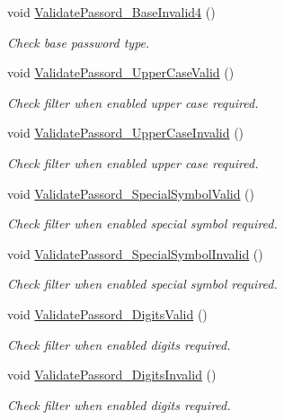 \begin{DoxyCompactItemize}
void \mbox{\hyperlink{class_authority_controller_1_1_tests_1_1_regex_af50420dae851df532abb87e5e9e12e81}{Validate\+Passord\+\_\+\+Base\+Invalid4}} ()
\begin{DoxyCompactList}\small\item\em Check base password type. \end{DoxyCompactList}\item 
void \mbox{\hyperlink{class_authority_controller_1_1_tests_1_1_regex_a66cf48873a320e5d6d0a1e63b1abbb71}{Validate\+Passord\+\_\+\+Upper\+Case\+Valid}} ()
\begin{DoxyCompactList}\small\item\em Check filter when enabled upper case required. \end{DoxyCompactList}\item 
void \mbox{\hyperlink{class_authority_controller_1_1_tests_1_1_regex_a8cda73ecc7836a9b0801addcd34784c1}{Validate\+Passord\+\_\+\+Upper\+Case\+Invalid}} ()
\begin{DoxyCompactList}\small\item\em Check filter when enabled upper case required. \end{DoxyCompactList}\item 
void \mbox{\hyperlink{class_authority_controller_1_1_tests_1_1_regex_a4638efee69d7d3d2bf072fa8dc9a82a3}{Validate\+Passord\+\_\+\+Special\+Symbol\+Valid}} ()
\begin{DoxyCompactList}\small\item\em Check filter when enabled special symbol required. \end{DoxyCompactList}\item 
void \mbox{\hyperlink{class_authority_controller_1_1_tests_1_1_regex_a8565a902ecf3f1abe0c2b25249d5ce6e}{Validate\+Passord\+\_\+\+Special\+Symbol\+Invalid}} ()
\begin{DoxyCompactList}\small\item\em Check filter when enabled special symbol required. \end{DoxyCompactList}\item 
void \mbox{\hyperlink{class_authority_controller_1_1_tests_1_1_regex_ab775e928b51f2cf90a705f50e7b6c2d8}{Validate\+Passord\+\_\+\+Digits\+Valid}} ()
\begin{DoxyCompactList}\small\item\em Check filter when enabled digits required. \end{DoxyCompactList}\item 
void \mbox{\hyperlink{class_authority_controller_1_1_tests_1_1_regex_a14648a7fbcdfe4500d019d175d2e4b68}{Validate\+Passord\+\_\+\+Digits\+Invalid}} ()
\begin{DoxyCompactList}\small\item\em Check filter when enabled digits required. \end{DoxyCompactList}\end{DoxyCompactItemize}
